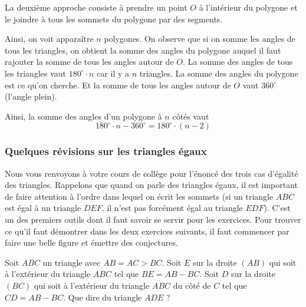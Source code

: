 \begin{preuve}
La deuxième approche consiste à prendre un point $O$ à l'intérieur du polygone et le joindre à tous les sommets du polygone par des segments.
\begin{figure}[H]
\end{figure}
Ainsi, on voit apparaître $n$ polygones. On observe que si on somme les angles de tous les triangles, on obtient la somme des angles du polygone auquel il faut rajouter la somme de tous les angles autour de $O$. La somme des angles de tous les triangles vaut $180^\circ\cdot n$ car il y a $n$ triangles. La somme des angles du polygone est ce qu'on cherche. Et la somme de tous les angles autour de $O$ vaut $360^\circ$ (l'angle plein).

Ainsi, la somme des angles d'un polygone à $n$ côtés vaut
$$180^\circ \cdot n - 360^\circ = 180^\circ\cdot(n - 2)$$
\end{preuve}


\subsubsection{Quelques révisions sur les triangles égaux}

Nous vous renvoyons à votre cours de collège pour l'énoncé des trois cas d'égalité des triangles. Rappelons que quand on parle des triangles égaux, il est important de faire attention à l'ordre dans lequel on écrit les sommets (si un triangle $ABC$ est égal à un triangle $DEF$, il n'est pas forcément égal au triangle $EDF$). C'est un des premiers outils dont il faut savoir se servir pour les exercices. Pour trouver ce qu'il faut démontrer dans les deux exercices suivants, il faut commencer par faire une belle figure et émettre des conjectures.

\begin{exo}
Soit $ABC$ un triangle avec $AB=AC>BC$. Soit $E$ sur la droite
$(AB)$ qui soit à l'extérieur du triangle $ABC$ tel que $BE=AB-BC$. Soit
$D$ sur la droite $(BC)$ qui soit à l'extérieur du triangle $ABC$ du côté
de $C$ tel que $CD=AB-BC$. Que dire du triangle $ADE$ ?
\end{exo}

